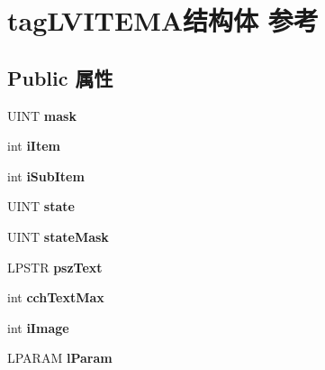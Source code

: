 \hypertarget{structtag_l_v_i_t_e_m_a}{}\section{tag\+L\+V\+I\+T\+E\+M\+A结构体 参考}
\label{structtag_l_v_i_t_e_m_a}
\subsection*{Public 属性}
\begin{DoxyCompactItemize}
\item 
\mbox{\label{structtag_l_v_i_t_e_m_a_a971ab9dd917938a9281bcdb4ee23d6e3}} 
U\+I\+NT {\bfseries mask}
\item 
\mbox{\label{structtag_l_v_i_t_e_m_a_a7e447f761abbc003d7ec28f63389cd27}} 
int {\bfseries i\+Item}
\item 
\mbox{\label{structtag_l_v_i_t_e_m_a_a21f4cd8c4ae1acaf077ff6707e7d35e4}} 
int {\bfseries i\+Sub\+Item}
\item 
\mbox{\label{structtag_l_v_i_t_e_m_a_acfe59e3bf85a63baeb168ab064f7038f}} 
U\+I\+NT {\bfseries state}
\item 
\mbox{\label{structtag_l_v_i_t_e_m_a_a0738fc39f973664806dfd36697ff4411}} 
U\+I\+NT {\bfseries state\+Mask}
\item 
\mbox{\label{structtag_l_v_i_t_e_m_a_a3920c0c98b745e80bee596848a054d5c}} 
L\+P\+S\+TR {\bfseries psz\+Text}
\item 
\mbox{\label{structtag_l_v_i_t_e_m_a_a385683189b95f78b9736859c29dd65e0}} 
int {\bfseries cch\+Text\+Max}
\item 
\mbox{\label{structtag_l_v_i_t_e_m_a_acc4e16e743d9dcbe1fd2e74109c3c44d}} 
int {\bfseries i\+Image}
\item 
\mbox{\label{structtag_l_v_i_t_e_m_a_ab87034992699ec8f07fcd13a3aec5954}} 
L\+P\+A\+R\+AM {\bfseries l\+Param}
\item 

\end{DoxyCompactItemize}
